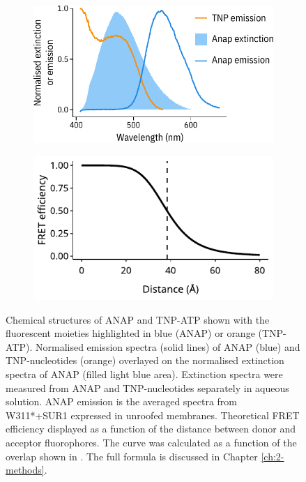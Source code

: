 \begin{figure}[h]
{\begin{subfigure}[t]{0.5\textwidth}
		\includegraphics[width=\textwidth]{spectral_overlap.pdf}
	\end{subfigure}
	\hfill
	\begin{subfigure}[t]{0.5\textwidth}
		\caption{}\label{ch3fig:fret_efficiency}
		\centering
		\includegraphics[width=\textwidth]{fret_efficiency.pdf}
	\end{subfigure}
	}
	\caption[ANAP and TNP-nucleotides as FRET pairs]{
		 Chemical structures of ANAP and TNP-ATP shown with the fluorescent moieties highlighted in blue (ANAP) or orange (TNP-ATP).
		 Normalised emission spectra (solid lines) of ANAP (blue) and TNP-nucleotides (orange) overlayed on the normalised extinction spectra of ANAP (filled light blue area).
		Extinction spectra were measured from ANAP and TNP-nucleotides separately in aqueous solution.
		ANAP emission is the averaged spectra from W311*+SUR1 expressed in unroofed membranes.
		 Theoretical FRET efficiency displayed as a function of the distance between donor and acceptor fluorophores.
		The curve was calculated as a function of the overlap shown in .
		The full formula is discussed in Chapter \ref{ch:2-methods}.
	}

\end{figure}


